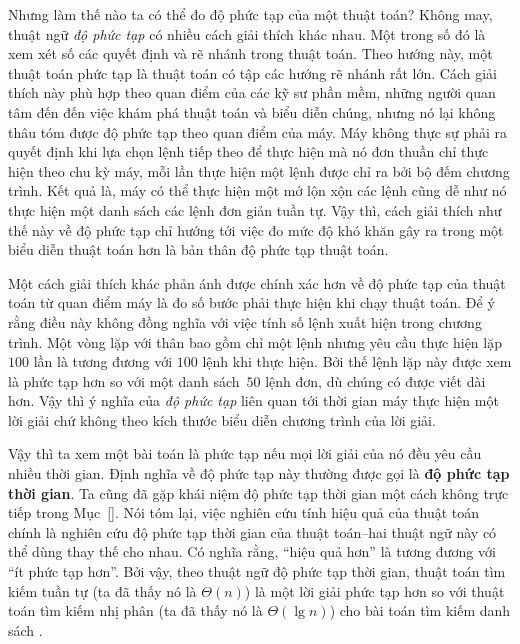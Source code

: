Nhưng làm thế nào ta có thể đo độ phức tạp của một thuật toán? Không may, thuật ngữ
\textit{độ phức tạp} có nhiều cách giải thích khác nhau. Một trong số đó là xem xét số các
quyết định và rẽ nhánh trong thuật toán. Theo hướng này, một thuật toán phức tạp là thuật
toán có tập các hướng rẽ nhánh rất lớn. Cách giải thích này phù hợp theo quan điểm của các
kỹ sư phần mềm, những người quan tâm đến đến việc khám phá thuật toán và biểu diễn chúng,
nhưng nó lại không thâu tóm được độ phức tạp theo quan điểm của máy. Máy không thực sự
phải ra quyết định khi lựa chọn lệnh tiếp theo để thực hiện mà nó đơn thuần chỉ thực hiện
theo chu kỳ máy, mỗi lần thực hiện một lệnh được chỉ ra bởi bộ đếm chương trình. Kết quả
là, máy có thể thực hiện một mớ lộn xộn các lệnh cũng dễ như nó thực hiện một danh sách
các lệnh đơn giản tuần tự. Vậy thì, cách giải thích như thế này về độ phức tạp chỉ hướng
tới việc đo mức độ khó khăn gây ra trong một biểu diễn thuật toán hơn là bản thân độ phức
tạp thuật toán.

Một cách giải thích khác phản ánh được chính xác hơn về độ phức tạp của thuật toán từ quan
điểm máy là đo số bước phải thực hiện khi chạy thuật toán. Để ý rằng điều này không đồng
nghĩa với việc tính số lệnh xuất hiện trong chương trình. Một vòng lặp với thân bao gồm
chỉ một lệnh nhưng yêu cầu thực hiện lặp $100$ lần là tương đương với $100$ lệnh khi thực
hiện. Bởi thế lệnh lặp này được xem là phức tạp hơn so với một danh sách~$50$ lệnh đơn, dù
chúng có được viết dài hơn. Vậy thì ý nghĩa của \textit{độ phức tạp} liên quan tới thời
gian máy thực hiện một lời giải chứ không theo kích thước biểu diễn chương trình của lời
giải.

Vậy thì ta xem một bài toán là phức tạp nếu mọi lời giải của nó đều yêu cầu nhiều thời
gian. Định nghĩa về độ phức tạp này thường được gọi là \textbf{độ phức tạp thời gian}. Ta
cũng đã gặp khái niệm độ phức tạp thời gian một cách không trực tiếp trong Mục~\ref{}. Nói
tóm lại, việc nghiên cứu tính hiệu quả của thuật toán chính là nghiên cứu độ phức tạp thời
gian của thuật toán--hai thuật ngữ này có thể dùng thay thế cho nhau. Có nghĩa rằng,
``hiệu quả hơn'' là tương đương với ``ít phức tạp hơn''. Bởi vậy, theo thuật ngữ độ phức
tạp thời gian, thuật toán tìm kiếm tuần tự (ta đã thấy nó là $\Theta(n)$) là một lời giải
phức tạp hơn so với thuật toán tìm kiếm nhị phân (ta đã thấy nó là $\Theta(\lg n)$) cho
bài toán tìm kiếm danh sách .


